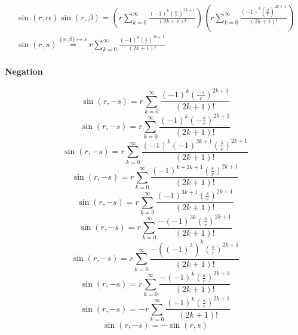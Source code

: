 \documentclass[a4paper,12pt]{report}
\begin{document}
\begin{landscape}
{\begin{gather}
\sin(r,\alpha) \sin(r,\beta) = \left(r \sum \limits_{k=0}^{\infty} \frac{(-1)^k \left(\frac{\alpha}{r}\right)^{2k+1}}{(2k+1)!}\right) \left(r \sum \limits_{k=0}^{\infty} \frac{(-1)^k \left(\frac{\beta}{r}\right)^{2k+1}}{(2k+1)!}\right) \\
\sin(r,s) \stackrel{\scriptscriptstyle \{\alpha, \beta\} \mapsto s}{=} r \sum \limits_{k=0}^{\infty} \frac{(-1)^k \left(\frac{s}{r}\right)^{2k+1}}{(2k+1)!}
\end{gather}
}
\end{landscape}
\paragraph{Negation}
\begin{equation}
\sin(r,-s) = r \sum \limits_{k=0}^{\infty} \frac{(-1)^k \left(\frac{-s}{r}\right)^{2k+1}}{(2k+1)!}
\end{equation}
\begin{equation}
\sin(r,-s) = r \sum \limits_{k=0}^{\infty} \frac{(-1)^k \left(-\frac{s}{r}\right)^{2k+1}}{(2k+1)!}
\end{equation}
\begin{equation}
\sin(r,-s) = r \sum \limits_{k=0}^{\infty} \frac{(-1)^k (-1)^{2k+1} \left(\frac{s}{r}\right)^{2k+1}}{(2k+1)!}
\end{equation}
\begin{equation}
\sin(r,-s) = r \sum \limits_{k=0}^{\infty} \frac{(-1)^{k+2k+1} \left(\frac{s}{r}\right)^{2k+1}}{(2k+1)!}
\end{equation}
\begin{equation}
\sin(r,-s) = r \sum \limits_{k=0}^{\infty} \frac{(-1)^{3k+1} \left(\frac{s}{r}\right)^{2k+1}}{(2k+1)!}
\end{equation}
\begin{equation}
\sin(r,-s) = r \sum \limits_{k=0}^{\infty} \frac{-(-1)^{3k} \left(\frac{s}{r}\right)^{2k+1}}{(2k+1)!}
\end{equation}
\begin{equation}
\sin(r,-s) = r \sum \limits_{k=0}^{\infty} \frac{-((-1)^3)^k \left(\frac{s}{r}\right)^{2k+1}}{(2k+1)!}
\end{equation}
\begin{equation}
\sin(r,-s) = r \sum \limits_{k=0}^{\infty} \frac{-(-1)^k \left(\frac{s}{r}\right)^{2k+1}}{(2k+1)!}
\end{equation}
\begin{equation}
\sin(r,-s) = -r \sum \limits_{k=0}^{\infty} \frac{(-1)^k \left(\frac{s}{r}\right)^{2k+1}}{(2k+1)!}
\end{equation}
\begin{equation}
\sin(r,-s) = -\sin(r,s)
\end{equation}
\end{document}
